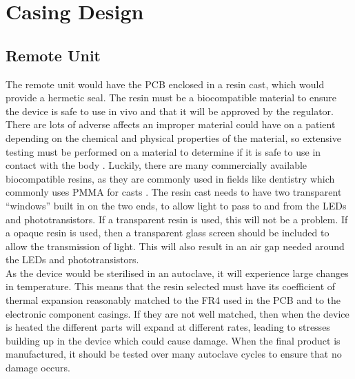 \section{Casing Design}

\subsection{Remote Unit}
The remote unit would have the PCB enclosed in a resin cast, which would provide a hermetic seal. The resin must be a biocompatible material to ensure the device is safe to use in vivo and that it will be approved by the regulator. There are lots of adverse affects an improper material could have on a patient depending on the chemical and physical properties of the material, so extensive testing must be performed on a material to determine if it is safe to use in contact with the body \cite{biocompatible_tests}. Luckily, there are many commercially available biocompatible resins, as they are commonly used in fields like dentistry which commonly uses PMMA for casts \cite{biocompatible_resin}. The resin cast needs to have two transparent ``windows'' built in on the two ends, to allow light to pass to and from the LEDs and phototransistors. If a transparent resin is used, this will not be a problem. If a opaque resin is used, then a transparent glass screen should be included to allow the transmission of light. This will also result in an air gap needed around the LEDs and phototransistors.\\

As the device would be sterilised in an autoclave, it will experience large changes in temperature. This means that the resin selected must have its coefficient of thermal expansion reasonably matched to the FR4 used in the PCB and to the electronic component casings. If they are not well matched, then when the device is heated the different parts will expand at different rates, leading to stresses building up in the device which could cause damage. When the final product is manufactured, it should be tested over many autoclave cycles to ensure that no damage occurs.\\

